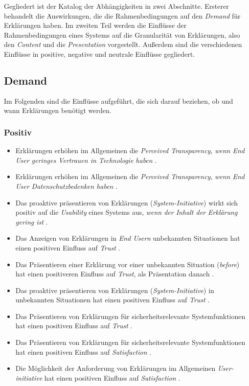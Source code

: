 Gegliedert ist der Katalog der Abhängigkeiten in zwei Abschnitte. Ersterer behandelt die Auswirkungen, die die Rahmenbedingungen auf den \textit{Demand} für Erklärungen haben. Im zweiten Teil werden die Einflüsse der Rahmenbedingungen eines Systems auf die Granularität von Erklärungen, also den \textit{Content} und die \textit{Presentation} vorgestellt. Außerdem sind die verschiedenen Einflüsse in positive, negative und neutrale Einflüsse gegliedert.

\newpage

\subsection*{Demand}

Im Folgenden sind die Einflüsse aufgeführt, die sich darauf beziehen, ob und wann Erklärungen benötigt werden.

\subsubsection*{Positiv}

\begin{itemize}
    \item Erklärungen erhöhen im Allgemeinen die \textit{Perceived Transparency}, \textit{wenn End User geringes Vertrauen in Technologie haben} \cite{tsai_effects_2020}. 
    \item Erklärungen erhöhen im Allgemeinen die \textit{Perceived Transparency}, \textit{wenn End User Datenschutzbedenken haben} \cite{tsai_effects_2020}.
    \item Das proaktive präsentieren von Erklärungen (\textit{System-Initiative}) wirkt sich positiv auf die \textit{Usability} eines Systems aus, \textit{wenn der Inhalt der Erklärung gering ist} \cite{???}.
    \item Das Anzeigen von Erklärungen in \textit{End Usern} unbekannten Situationen hat einen positiven Einfluss auf \textit{Trust} \cite{haspiel_explanations_2018}.
    \item Das Präsentieren einer Erklärung vor einer unbekannten Situation (\textit{before}) hat einen positiveren Einfluss auf \textit{Trust}, als Präsentation danach \cite{haspiel_explanations_2018}.
    \item Das proaktive präsentieren von Erklärungen (\textit{System-Initiative}) in unbekannten Situationen hat einen positiven Einfluss auf \textit{Trust} \cite{zhu_effects_2020}.
    \item Das Präsentieren von Erklärungen für sicherheitsrelevante Systemfunktionen hat einen positiven Einfluss auf \textit{Trust}  \cite{wiegand2019drive}.
    \item Das Präsentieren von Erklärungen für sicherheitsrelevante Systemfunktionen hat einen positiven Einfluss auf \textit{Satisfaction}  \cite{wiegand2019drive}.
    \item Die Möglichkeit der Anforderung von Erklärungen im Allgemeinen \textit{User-initiative} hat einen positiven Einfluss auf \textit{Satisfaction} \cite{chazette_end-users_nodate}.
\end{itemize}

